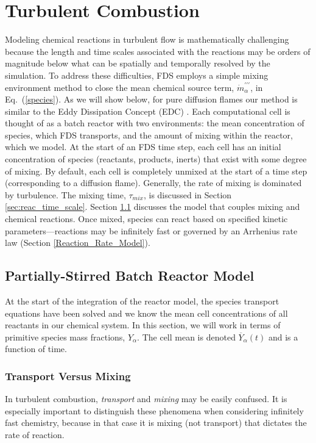 \section{Turbulent Combustion}

Modeling chemical reactions in turbulent flow is mathematically challenging because the length and time scales associated with the reactions may be orders of magnitude below what can be spatially and temporally resolved by the simulation. To address these difficulties, FDS employs a simple mixing environment method to close the mean chemical source term, $\dot{m}^{\prime\prime\prime}_{\alpha}$, in Eq.~(\ref{species}).  As we will show below, for pure diffusion flames our method is similar to the Eddy Dissipation Concept (EDC) \cite{Magnussen:1}. Each computational cell is thought of as a batch reactor with two environments: the mean concentration of species, which FDS transports, and the amount of mixing within the reactor, which we model. At the start of an FDS time step, each cell has an initial concentration of species (reactants, products, inerts) that exist with some degree of mixing. By default, each cell is completely unmixed at the start of a time step (corresponding to a diffusion flame). Generally, the rate of mixing is dominated by turbulence.  The mixing time, $\tau_{mix}$, is discussed in Section \ref{sec:reac_time_scale}. Section \ref{sec:EDC} discusses the model that couples mixing and chemical reactions. Once mixed, species can react based on specified kinetic parameters---reactions may be infinitely fast or governed by an Arrhenius rate law (Section \ref{Reaction_Rate_Model}). 


\subsection{Partially-Stirred Batch Reactor Model}
\label{sec:EDC}

At the start of the integration of the reactor model, the species transport equations have been solved and we know the mean cell concentrations of all reactants in our chemical system.  In this section, we will work in terms of primitive species mass fractions, $Y_\alpha$.  The cell mean is denoted $\overline{Y}_\alpha(t)$ and is a function of time.

\subsubsection{Transport Versus Mixing}

In turbulent combustion, \emph{transport} and \emph{mixing} may be easily confused.  It is especially important to distinguish these phenomena when considering infinitely fast chemistry, because in that case it is mixing (not transport) that dictates the rate of reaction.

